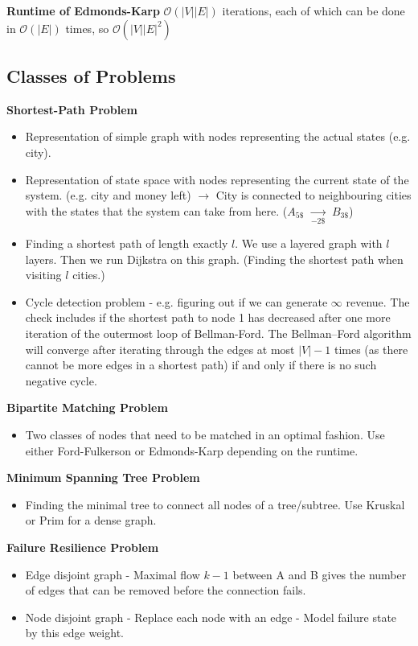 \documentclass[9pt,landscape,a4paper, table]{extarticle}
\begin{document}
\begin{multicols*}{3}
\textbf{Runtime of Edmonds-Karp}
$\mathcal{O}(|V||E|)$ iterations, each of which can be done in $\mathcal{O}( |E|)$ times, so $\mathcal{O}(|V||E|^2)$

\subsection{Classes of Problems}

\textbf{Shortest-Path Problem}
\begin{itemize}
    \item Representation of simple graph with nodes representing the actual states (e.g. city).
    \item Representation of state space with nodes representing the current state of the system. (e.g. city and money left) $\rightarrow$ City is connected to neighbouring cities with the states that the system can take from here. ($A_{5\$}$ $\underset{-2\$}{\rightarrow}$ $B_{3\$}$)
    \item Finding a shortest path of length exactly $l$. We use a layered graph with $l$ layers. Then we run Dijkstra on this graph. (Finding the shortest path when visiting $l$ cities.)
    \item Cycle detection problem - e.g. figuring out if we can generate $\infty$ revenue. The check includes if the shortest path to node 1 has decreased after one more iteration of the outermost loop of Bellman-Ford. The Bellman–Ford algorithm will converge after iterating through the edges at most $| V | -1$ times (as there cannot be more edges in a shortest path) if and only if there is no such negative cycle.
\end{itemize}

\textbf{Bipartite Matching Problem}
\begin{itemize}
    \item Two classes of nodes that need to be matched in an optimal fashion. Use either Ford-Fulkerson or Edmonds-Karp depending on the runtime. 
\end{itemize}

\textbf{Minimum Spanning Tree Problem}

\begin{itemize}
    \item Finding the minimal tree to connect all nodes of a tree/subtree. Use Kruskal or Prim for a dense graph. 
\end{itemize}

\textbf{Failure Resilience Problem}

\begin{itemize}
    \item Edge disjoint graph - Maximal flow $k- 1$ between A and B gives the number of edges that can be removed before the connection fails. 
    \item Node disjoint graph - Replace each node with an edge - Model failure state by this edge weight. 
\end{itemize}


\end{multicols*}
\end{document}
